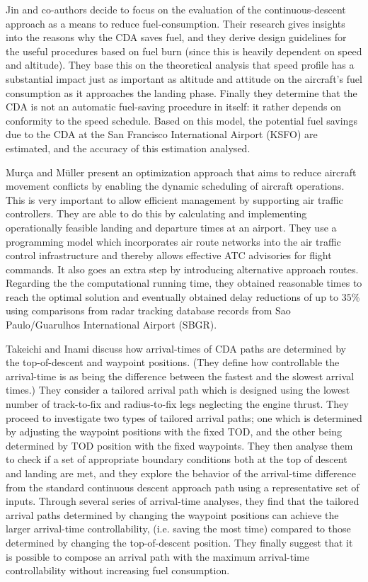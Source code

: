 \documentclass{aer1315-pretty}
\begin{document}
Jin and co-authors \cite{Jin:2013} decide to focus on the evaluation of the continuous-descent approach as a means to reduce fuel-consumption. Their research gives insights into the reasons why the CDA saves fuel, and they derive design guidelines for the useful procedures based on fuel burn (since this is heavily dependent on speed and altitude). They base this on the theoretical analysis that speed profile has a substantial impact just as important as altitude and attitude on the aircraft's fuel consumption as it approaches the landing phase. Finally they determine that the CDA is not an automatic fuel-saving procedure in itself: it rather depends on conformity to the speed schedule. Based on this model, the potential fuel savings due to the CDA at the San Francisco International Airport (KSFO) are estimated, and the accuracy of this estimation analysed. \par

Mur\c{c}a and M{\"u}ller \cite{Murca:2015} present an optimization approach that aims to reduce aircraft movement conflicts by enabling the dynamic scheduling of aircraft operations. This is very important to allow efficient management by supporting air traffic controllers. They are able to do this by calculating and implementing operationally feasible landing and departure times at an airport. They use a programming model which incorporates air route networks into the  air traffic control infrastructure and thereby allows effective ATC advisories for flight commands. It also goes an extra step by introducing alternative approach routes. Regarding the the computational running time, they obtained reasonable times to reach the optimal solution and eventually obtained delay reductions of up to $35 \%$ using comparisons from radar tracking database records from Sao Paulo/Guarulhos International Airport (SBGR). \par


Takeichi and Inami \cite{Takeichi:2010} discuss how arrival-times of CDA paths are determined by the top-of-descent and waypoint positions. (They define how controllable the arrival-time is  as being the difference between the fastest and the slowest arrival times.) They consider a tailored arrival path which is designed using the lowest number of track-to-fix and radius-to-fix legs neglecting the engine thrust. They proceed to investigate two types of tailored arrival paths; one which is determined by adjusting the waypoint positions with the fixed TOD, and the other being determined by TOD position with the fixed waypoints. They then analyse them to check if a set of appropriate boundary conditions both at the top of descent and landing are met, and they explore the behavior of the arrival-time difference from the standard continuous descent approach path using a representative set of inputs. Through several series of arrival-time analyses, they find that the tailored arrival paths determined by changing the waypoint positions can achieve the larger arrival-time controllability, (i.e. saving the most time) compared to those determined by changing the top-of-descent position. They finally suggest that it is possible to compose an arrival path with the maximum arrival-time controllability without increasing fuel consumption. \par
\end{document}
